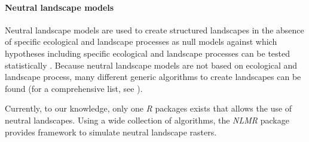 \documentclass[smallextended]{svjour3}       %
\begin{document}
\hypertarget{sec:NLM}{%
\paragraph{Neutral landscape models}\label{sec:NLM}}

Neutral landscape models are used to create structured landscapes in the
absence of specific ecological and landscape processes as null models
against which hypotheses including specific ecological and landscape
processes can be tested statistically \cite{Gardner1987,With1997}.
Because neutral landscape models are not based on ecological and
landscape process, many different generic algorithms to create
landscapes can be found (for a comprehensive list, see
\cite{Sciaini2018}).

Currently, to our knowledge, only one \emph{R} packages exists that
allows the use of neutral landscapes. Using a wide collection of
algorithms, the \emph{NLMR} package \cite{Sciaini2018} provides
framework to simulate neutral landscape rasters.
\end{document}
